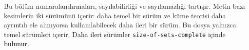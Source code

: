 \documentclass[../../../include/open-logic-chapter]{subfiles}
\begin{document}
\begin{editorial}
Bu bölüm numaralandırmaları, sayılabilirliği ve sayılamazlığı tartışır.
Metin bazı kesimlerin iki sürümünü içerir: daha temel bir sürüm ve küme
teorisi daha ayrıntılı ele alınıyorsa kullanılabilecek daha ileri bir sürüm.
Bu dosya yalnızca temel sürümleri içerir. Daha ileri sürümler
\verb|size-of-sets-complete| içinde bulunur.
\end{editorial}
\OLEndChapterHook
\end{document}
